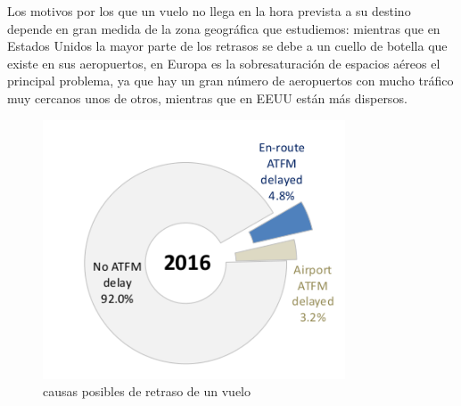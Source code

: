 Los motivos por los que un vuelo no llega en la hora prevista a su destino depende en gran medida de la zona geográfica que estudiemos: mientras que en Estados Unidos la mayor parte de los retrasos se debe a un cuello de botella que existe en sus aeropuertos, en Europa es la sobresaturación de espacios aéreos el principal problema, ya que hay un gran número de aeropuertos con mucho tráfico muy cercanos unos de otros, mientras que en EEUU están más dispersos.
\begin{figure}[H]
	\begin{center}
		\centering
		\includegraphics[width=0.8\textwidth]{./imagenes/introduccion/tiposRetrasos.png}
		\caption{causas posibles de retraso de un vuelo}
		\label{fig: Causas posibles de retraso de un vuelo}
	\end{center}
\end{figure}

